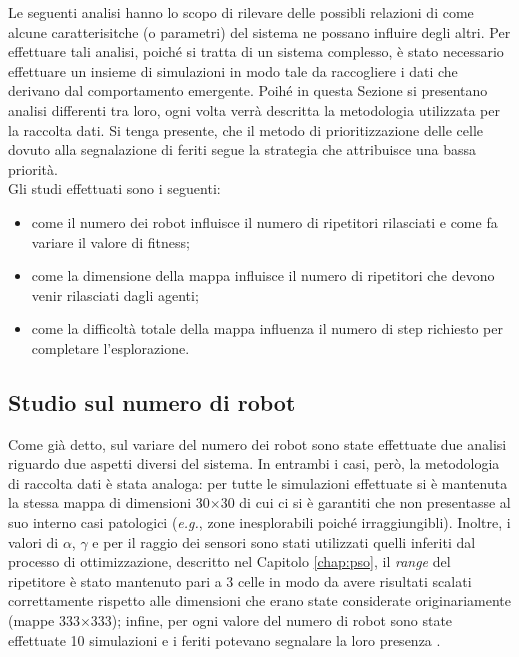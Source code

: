 Le seguenti analisi hanno lo scopo di rilevare delle possibli relazioni di come alcune caratterisitche (o parametri) del sistema ne possano influire degli altri.
Per effettuare tali analisi, poiché si tratta di un sistema complesso, è stato necessario effettuare un insieme di simulazioni in modo tale da raccogliere i dati che derivano dal comportamento emergente.
Poihé in questa Sezione si presentano analisi differenti tra loro, ogni volta verrà descritta la metodologia utilizzata per la raccolta dati.
Si tenga presente, che il metodo di prioritizzazione delle celle dovuto alla segnalazione di feriti segue la strategia che attribuisce una bassa priorità.\\
Gli studi effettuati sono i seguenti:\begin{itemize}
	\item come il numero dei robot influisce il numero di ripetitori rilasciati e come fa variare il valore di fitness;
	\item come la dimensione della mappa influisce il numero di ripetitori che devono venir rilasciati dagli agenti;
	\item come la difficoltà totale della mappa influenza il numero di step richiesto per completare l'esplorazione.
\end{itemize}
\subsection{Studio sul numero di robot}
\label{subsec:nrobots}
Come già detto, sul variare del numero dei robot sono state effettuate due analisi riguardo due aspetti diversi del sistema.
In entrambi i casi, però, la metodologia di raccolta dati è stata analoga: per tutte le simulazioni effettuate si è mantenuta la stessa mappa di dimensioni 30$\times$30 di cui ci si è garantiti che non presentasse al suo interno casi patologici (\textit{e.g.}, zone inesplorabili poiché irraggiungibli).
Inoltre, i valori di $\alpha$, $\gamma$ e per il raggio dei sensori sono stati utilizzati quelli inferiti dal processo di ottimizzazione, descritto nel Capitolo \ref{chap:pso}, il \textit{range} del ripetitore è stato mantenuto pari a 3 celle in modo da avere risultati scalati correttamente rispetto alle dimensioni che erano state considerate originariamente (mappe 333$\times$333); infine, per ogni valore del numero di robot sono state effettuate 10 simulazioni e i feriti potevano segnalare la loro presenza .

